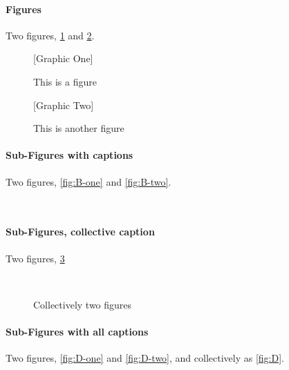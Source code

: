 \documentclass{article}
\begin{document}
\paragraph{Figures}
Two figures, \ref{fig:A-one} and \ref{fig:A-two}.

\begin{figure}[ht]
\begin{center}
 [Graphic One]\\
\caption{This is a figure\label{fig:A-one}}
\end{center}
\end{figure}

\begin{figure}[ht]
\begin{center}
[Graphic Two]\\
\caption{This is another figure\label{fig:A-two}}
\end{center}
\end{figure}

\paragraph{Sub-Figures with captions}
Two figures, \ref{fig:B-one} and \ref{fig:B-two}.

\begin{figure}[ht]
\begin{center}
\\
\end{center}
\end{figure}

\paragraph{Sub-Figures, collective caption}
Two figures, \ref{fig:C}

\begin{figure}[ht]
\begin{center}
\\
\end{center}
\caption{Collectively two figures\label{fig:C}}
\end{figure}

\paragraph{Sub-Figures with all captions}
Two figures, \ref{fig:D-one} and \ref{fig:D-two},
and collectively as \ref{fig:D}.
\end{document}
